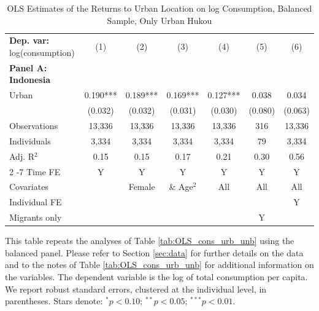\begin{table}[htbp] \centering \begin{threeparttable}
 \caption{OLS Estimates of the Returns to Urban Location on log Consumption, Balanced Sample, Only Urban Hukou} 
 \label{tab:OLS_CHN_hukou_urban_only_consumption_urban_bal} 
\begin{tabular}{l cccccc} \toprule  \textbf{Dep. var:}  log(consumption) 
                    &\multicolumn{1}{c}{(1)}   &\multicolumn{1}{c}{(2)}   &\multicolumn{1}{c}{(3)}   &\multicolumn{1}{c}{(4)}   &\multicolumn{1}{c}{(5)}   &\multicolumn{1}{c}{(6)}   \\
\textbf{Panel A: Indonesia} \\
Urban               &       0.190***&       0.189***&       0.169***&       0.127***&       0.038   &       0.034   \\
                    &     (0.032)   &     (0.032)   &     (0.031)   &     (0.030)   &     (0.080)   &     (0.063)   \\
\addlinespace
Observations        &      13,336   &      13,336   &      13,336   &      13,336   &         316   &      13,336   \\
Individuals         &       3,334   &       3,334   &       3,334   &       3,334   &          79   &       3,334   \\
Adj. R$^{2}$        &        0.15   &        0.15   &        0.17   &        0.21   &        0.30   &        0.56   \\
\cmidrule{2 -7} Time FE & Y & Y & Y & Y & Y & Y \\ Covariates & & Female & \& Age$^2$ & All & All & All \\ Individual FE & & & & & & Y \\ Migrants only & & & & & Y & \\ \bottomrule \end{tabular} \begin{tablenotes}[flushleft] \footnotesize \item{This table repeats the analyses of Table \ref{tab:OLS_cons_urb_unb}  using the balanced panel. Please refer to Section \ref{sec:data} for further details on the data and to the notes of Table \ref{tab:OLS_cons_urb_unb} for additional information on the variables. The dependent variable is the log of total consumption per capita. We report robust standard errors, clustered at the individual level, in parentheses. Stars denote: $^{*} p<0.10$; $^{**} p<0.05$; $^{***} p<0.01$.} \end{tablenotes} \end{threeparttable} \end{table}
